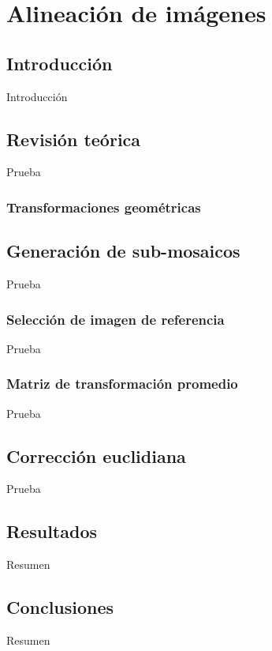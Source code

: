 \chapter{Alineación de imágenes}
\label{capitulo4}

\section{Introducción}

Introducción



\section{Revisión teórica}
Prueba

\subsection{Transformaciones geométricas}

\section{Generación de sub-mosaicos}
Prueba

\subsection{Selección de imagen de referencia}
Prueba

\subsection{Matriz de transformación promedio}
Prueba

\section{Corrección euclidiana}
Prueba

\section{Resultados}
Resumen

\section{Conclusiones}
Resumen



